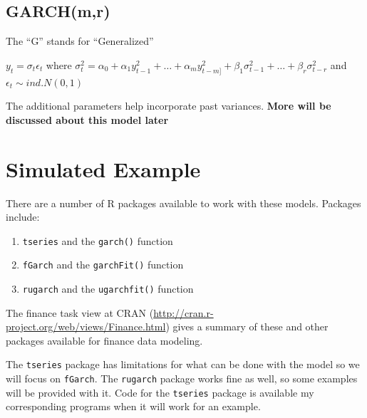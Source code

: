 \documentclass[
]{book}
\providecommand{\tightlist}{%
  \setlength{\itemsep}{0pt}\setlength{\parskip}{0pt}}
\theoremstyle{definition}
\theoremstyle{definition}
\theoremstyle{definition}
\theoremstyle{definition}
\theoremstyle{remark}
\begin{document}
\hypertarget{garchmr}{%
\subsection{GARCH(m,r)}\label{garchmr}}

The ``G'' stands for ``Generalized''

\(y_t = \sigma_t\epsilon_t\) where \(\sigma_t^2= \alpha_0 + \alpha_1y^2_{t-1} + … + \alpha_my^2_{t-m]}+ \beta_1\sigma^2_{t-1} + … +\beta_r\sigma_{t-r}^2\) and \(\epsilon_t \sim ind.N(0,1)\)

The additional parameters help incorporate past variances. \textbf{More will be discussed about this model later}

\hypertarget{simulated-example}{%
\section{Simulated Example}\label{simulated-example}}

There are a number of R packages available to work with these models. Packages include:

\begin{enumerate}
\def\labelenumi{\arabic{enumi})}
\tightlist
\item
  \texttt{tseries} and the \texttt{garch()} function
\item
  \texttt{fGarch} and the \texttt{garchFit()} function
\item
  \texttt{rugarch} and the \texttt{ugarchfit()} function
\end{enumerate}

The finance task view at CRAN (\url{http://cran.r-project.org/web/views/Finance.html}) gives a summary of these and other packages available for finance data modeling.

The \texttt{tseries} package has limitations for what can be done with the model so we will focus on \texttt{fGarch}. The \texttt{rugarch} package works fine as well, so some examples will be provided with it. Code for the \texttt{tseries} package is available my corresponding programs when it will work for an example.
\end{document}
